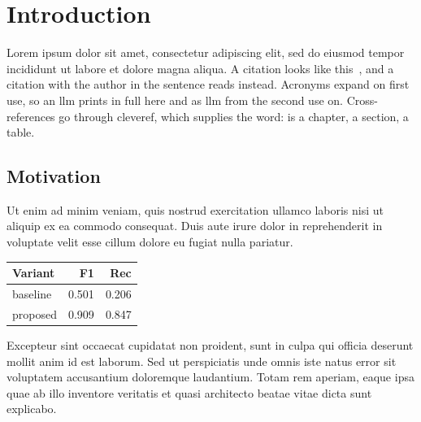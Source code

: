 \chapter{Introduction}
\label{chap:introduction}

Lorem ipsum dolor sit amet, consectetur adipiscing elit, sed do eiusmod tempor incididunt ut labore et dolore magna aliqua.
A citation looks like this~\cite{example_JournalArticle_2023}, and a citation with the author in the sentence reads \textcite{example_ConferencePaper_2024} instead.
Acronyms expand on first use, so an \ac{llm} prints in full here and as \ac{llm} from the second use on.
Cross-references go through cleveref, which supplies the word:  is a chapter,  a section,  a table.

\section{Motivation}
\label{sec:motivation}

Ut enim ad minim veniam, quis nostrud exercitation ullamco laboris nisi ut aliquip ex ea commodo consequat.
Duis aute irure dolor in reprehenderit in voluptate velit esse cillum dolore eu fugiat nulla pariatur.

\begin{margintable}
  \centering
  \caption[A table in the margin]{A margin table. It sits in the 41.4\,mm margin column, so keep it to three or four narrow columns.}
  \label{tab:intro-example}
  \small
  \begin{tabular}{@{}lrr@{}}
    \toprule
    Variant & F1 & Rec \\
    \midrule
    baseline & 0.501 & 0.206 \\
    proposed & 0.909 & 0.847 \\
    \bottomrule
  \end{tabular}
\end{margintable}

Excepteur sint occaecat cupidatat non proident, sunt in culpa qui officia deserunt mollit anim id est laborum.
Sed ut perspiciatis unde omnis iste natus error sit voluptatem accusantium doloremque laudantium.
Totam rem aperiam, eaque ipsa quae ab illo inventore veritatis et quasi architecto beatae vitae dicta sunt explicabo.

